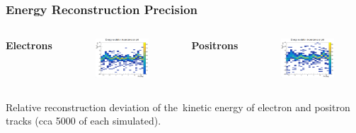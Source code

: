 \documentclass{beamer}
\begin{document}
	\begin{frame}
		\frametitle{Energy Reconstruction Precision}
		\centering
		\begin{columns}
			\centering
			\Large \textbf{Electrons}
			\begin{figure}
				\centering
				\includegraphics[width = 0.95 \linewidth]{../images/h_e_deltaenergy_phi.png}
			\end{figure}
			\centering
			\Large \textbf{Positrons}
			\begin{figure}
				\centering
				\includegraphics[width = 0.95 \linewidth]{../images/h_p_deltaenergy_phi.png}
			\end{figure}
		\end{columns}
		\vspace{0.5cm}
		\footnotesize{Relative reconstruction deviation of the~kinetic energy of electron and positron tracks (cca 5000 of each simulated).}
	\end{frame}
\end{document}
